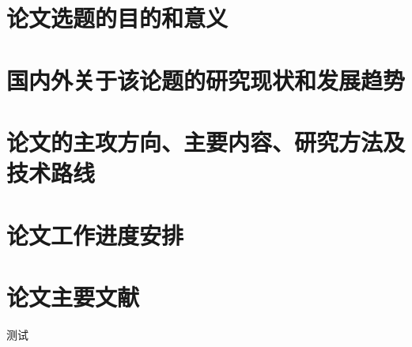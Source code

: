 
\ProposalReport
\ProposalReportInfomation


\section{论文选题的目的和意义}

\zhlipsum[1-2]


\section{国内外关于该论题的研究现状和发展趋势}

\zhlipsum[1]


\section{论文的主攻方向、主要内容、研究方法及技术路线}

\zhlipsum[1]


\section{论文工作进度安排}

\zhlipsum[1]


\section{论文主要文献}

测试 \cite{4.1.2:1}

\nocite{*}





\ProposalReportSignature
